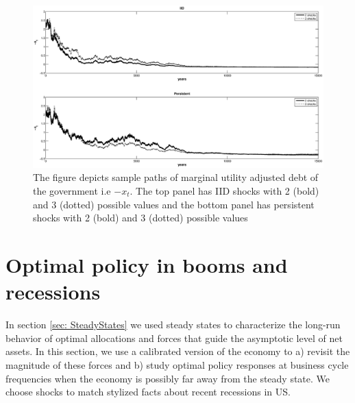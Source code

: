 \documentclass[thmsb,11pt]{article}
\begin{document}
%
%
   \begin{figure}[htp]
  \centering
  \includegraphics[width=\textwidth]{Draft25Graphs/generalshocks_x.eps}
  \caption{The figure depicts sample paths of marginal utility adjusted debt of the government i.e  $-x_t$. The top panel has IID shocks with 2 (bold) and 3 (dotted) possible values and the bottom panel has persistent shocks with 2 (bold) and 3 (dotted) possible values}
 \label{fig:moregeneralshocks}
  \end{figure}

\section{\protect\smallskip Optimal policy in booms and recessions}\label{Sec: numerical}

\smallskip

In section \ref{sec: SteadyStates} we used steady states to characterize the long-run behavior of optimal allocations and forces that guide the asymptotic level of net assets. In this section, we use a calibrated version of the economy to a) revisit the magnitude of these forces and b) study optimal policy responses at business cycle frequencies when the economy is possibly far away from the steady state. We choose shocks to match stylized facts about recent
recessions in US.



%




%
\end{document}

